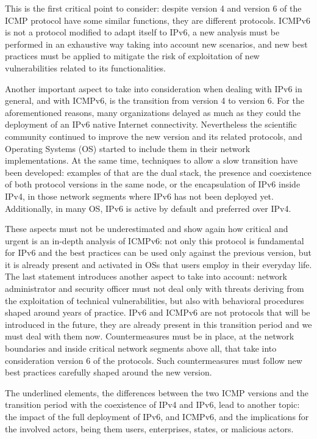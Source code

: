 \documentclass[12pt]{article}
\begin{document}
This is the first critical point to consider: despite version 4 and version 6 of the ICMP protocol have some similar functions, they are different protocols. ICMPv6 is not a protocol modified to adapt itself to IPv6, a new analysis must be performed in an exhaustive way taking into account new scenarios, and new best practices must be applied to mitigate the risk of exploitation of new vulnerabilities related to its functionalities.

Another important aspect to take into consideration when dealing with IPv6 in general, and with ICMPv6, is the transition from version 4 to version 6. For the aforementioned reasons, many organizations delayed as much as they could the deployment of an IPv6 native Internet connectivity. Nevertheless the scientific community continued to improve the new version and its related protocols, and Operating Systems (OS) started to include them in their network implementations. At the same time, techniques to allow a slow transition have been developed: examples of that are the dual stack, the presence and coexistence of both protocol versions in the same node, or the encapsulation of IPv6 inside IPv4, in those network segments where IPv6 has not been deployed yet. Additionally, in many OS, IPv6 is active by default and preferred over IPv4.

These aspects must not be underestimated and show again how critical and urgent is an in-depth analysis of ICMPv6: not only this protocol is fundamental for IPv6 and the best practices can be used only against the previous version, but it is already present and activated in OSs that users employ in their everyday life. The last statement introduces another aspect to take into account: network administrator and security officer must not deal only with threats deriving from the exploitation of technical vulnerabilities, but also with behavioral procedures shaped around years of practice. IPv6 and ICMPv6 are not protocols that will be introduced in the future, they are already present in this transition period and we must deal with them now. Countermeasures must be in place, at the network boundaries and inside critical network segments above all, that take into consideration version 6 of the protocols. Such countermeasures must follow new best practices carefully shaped around the new version.

The underlined elements, the differences between the two ICMP versions and the transition period with the coexistence of IPv4 and IPv6, lead to another topic: the impact of the full deployment of IPv6, and ICMPv6, and the implications for the involved actors, being them users, enterprises, states, or malicious actors.
\end{document}

